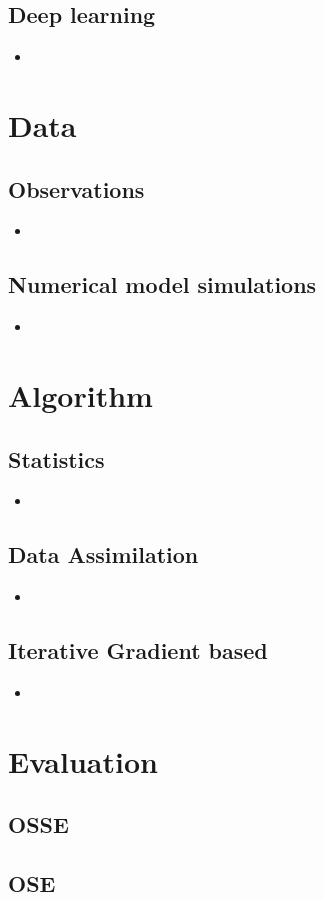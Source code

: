 \begin{bibunit}
  \subsection{Deep learning}
  \begin{itemize}
    \item 
  \end{itemize}
\section{Data}
  \subsection{Observations}
  \begin{itemize}
    \item 
  \end{itemize}
  \subsection{Numerical model simulations}
  \begin{itemize}
    \item 
  \end{itemize}
\section{Algorithm}
  \subsection{Statistics}
  \begin{itemize}
    \item 
  \end{itemize}
  \subsection{Data Assimilation}
  \begin{itemize}
    \item 
  \end{itemize}
  \subsection{Iterative Gradient based}
  \begin{itemize}
    \item 
  \end{itemize}
\section{Evaluation}
  \subsection{OSSE}
  \subsection{OSE}

\end{bibunit}

